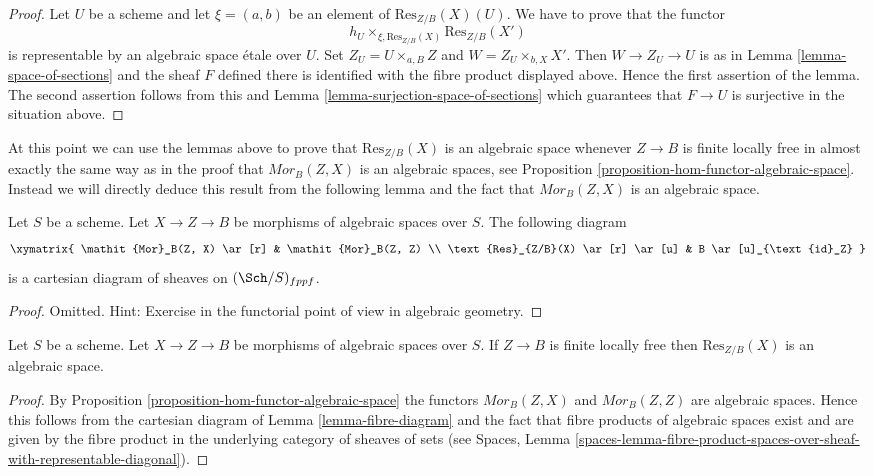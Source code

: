 \begin{proof}
Let $U$ be a scheme and let $\xi = (a, b)$ be an element of
$\text{Res}_{Z/B}(X)(U)$. We have to prove that the functor
$$
h_U \times_{\xi, \text{Res}_{Z/B}(X)} \text{Res}_{Z/B}(X')
$$
is representable by an algebraic space \'etale over $U$. Set
$Z_U = U \times_{a, B} Z$ and $W = Z_U \times_{b, X} X'$.
Then $W \to Z_U \to U$ is as in
Lemma \ref{lemma-space-of-sections}
and the sheaf $F$ defined there is identified with the fibre product
displayed above. Hence the first assertion of the lemma.
The second assertion follows from this and
Lemma \ref{lemma-surjection-space-of-sections}
which guarantees that $F \to U$ is surjective in the situation above.
\end{proof}

\noindent
At this point we can use the lemmas above to prove that $\text{Res}_{Z/B}(X)$
is an algebraic space whenever $Z \to B$ is finite locally free in almost
exactly the same way as in the proof that $\mathit{Mor}_B(Z, X)$ is an
algebraic spaces, see
Proposition \ref{proposition-hom-functor-algebraic-space}.
Instead we will directly deduce this result from the following lemma
and the fact that $\mathit{Mor}_B(Z, X)$ is an algebraic space.

\begin{lemma}
\label{lemma-fibre-diagram}
Let $S$ be a scheme. Let $X \to Z \to B$ be morphisms of
algebraic spaces over $S$. The following diagram
$$
\xymatrix{
\mathit{Mor}_B(Z, X) \ar[r] & \mathit{Mor}_B(Z, Z) \\
\text{Res}_{Z/B}(X) \ar[r] \ar[u] & B \ar[u]_{\text{id}_Z}
}
$$
is a cartesian diagram of sheaves on $(\Sch/S)_{fppf}$.
\end{lemma}

\begin{proof}
Omitted. Hint: Exercise in the functorial point of view in algebraic
geometry.
\end{proof}

\begin{proposition}
\label{proposition-restriction-of-scalars-algebraic-space}
Let $S$ be a scheme. Let $X \to Z \to B$ be morphisms of
algebraic spaces over $S$. If $Z \to B$ is finite locally free
then $\text{Res}_{Z/B}(X)$ is an algebraic space.
\end{proposition}

\begin{proof}
By
Proposition \ref{proposition-hom-functor-algebraic-space}
the functors $\mathit{Mor}_B(Z, X)$ and $\mathit{Mor}_B(Z, Z)$
are algebraic spaces. Hence this follows from the cartesian
diagram of
Lemma \ref{lemma-fibre-diagram}
and the fact that fibre products of algebraic spaces exist and
are given by the fibre product in the underlying category of
sheaves of sets (see
Spaces, Lemma
\ref{spaces-lemma-fibre-product-spaces-over-sheaf-with-representable-diagonal}).
\end{proof}






